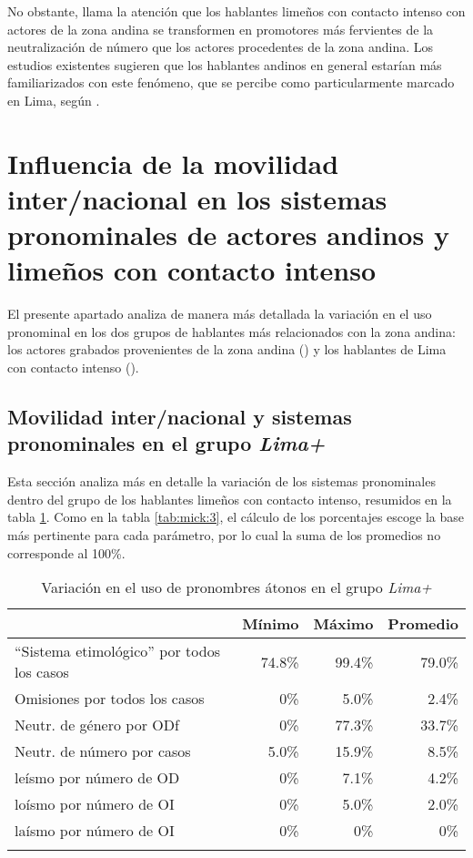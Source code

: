 \documentclass[output=paper]{../langscibook}
\begin{document}
No obstante, llama la atención que los hablantes limeños con contacto intenso con actores de la zona andina se transformen en promotores más fervientes de la neutralización de número que los actores procedentes de la zona andina. Los estudios existentes sugieren que los hablantes andinos en general estarían más familiarizados con este fenómeno, que se percibe como particularmente marcado en Lima, según \citet{Caravedo2014}. 

\section{Influencia de la movilidad inter/nacional en los sistemas pronominales de actores andinos y limeños con contacto intenso}\label{sec:mick:6}

El presente apartado analiza de manera más detallada la variación en el uso pronominal en los dos grupos de hablantes más relacionados con la zona andina: los actores grabados provenientes de la zona andina () y los hablantes de Lima con contacto intenso ().

\subsection{Movilidad inter/nacional y sistemas pronominales en el grupo \textit{Lima+}}\label{sec:mick:6.1}

Esta sección analiza más en detalle la variación de los sistemas pronominales dentro del grupo de los hablantes limeños con contacto intenso, resumidos en la tabla \ref{tab:mick:5}. Como en la tabla \ref{tab:mick:3}, el cálculo de los porcentajes escoge la base más pertinente para cada parámetro, por lo cual la suma de los promedios no corresponde al 100\%.

\begin{table}
\caption{\label{tab:mick:5} Variación en el uso de pronombres átonos en el grupo \textit{Lima+}}

\begin{tabularx}{\textwidth}{Xrrr}
\lsptoprule
& Mínimo & Máximo & Promedio\\
\midrule
“Sistema etimológico” por todos los casos & 74.8\% & 99.4\% & 79.0\%\\
Omisiones por todos los casos & 0\% & 5.0\% & 2.4\%\\
Neutr. de género por ODf & 0\% & 77.3\% & 33.7\%\\
Neutr. de número por casos & 5.0\% & 15.9\% & 8.5\%\\
leísmo por número de OD & 0\% & 7.1\% & 4.2\%\\
loísmo por número de OI & 0\%     & { 5.0\%} &  { 2.0\%}      \\
laísmo por número de OI & { 0\%}  &    0\% &                   0\%\\
\lspbottomrule
\end{tabularx}
\end{table}
\end{document}
